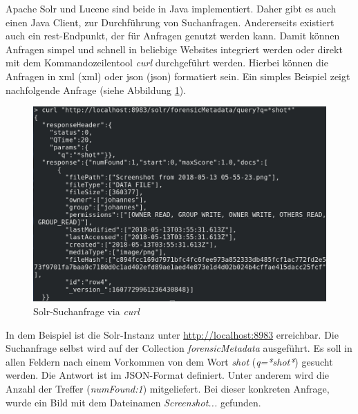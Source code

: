 \noindent
Apache Solr und Lucene sind beide in Java implementiert. Daher gibt es auch einen Java Client, zur Durchführung von Suchanfragen. Andererseits existiert auch ein \gls{rest}-Endpunkt, der für Anfragen genutzt werden kann. Damit können Anfragen simpel und schnell in beliebige Websites integriert werden oder direkt mit dem Kommandozeilentool \textit{curl} durchgeführt werden. Hierbei können die Anfragen in \acrshort{xml} (\acrlong{xml}) oder \acrshort{json} (\acrlong{json}) formatiert sein. Ein simples Beispiel zeigt nachfolgende Anfrage (siehe Abbildung \ref{fig:solr_request}).\\

\begin{figure}[ht]
  \centering
  \includegraphics[width=\textwidth]{./resource/solr_request.png}
  \caption{Solr-Suchanfrage via \textit{curl}}
  \label{fig:solr_request}
\end{figure}

\noindent
In dem Beispiel ist die Solr-Instanz unter \url{http://localhost:8983} erreichbar. Die Suchanfrage selbst wird auf der Collection \textit{forensicMetadata} ausgeführt. Es soll in allen Feldern nach einem Vorkommen von dem Wort \textit{shot} (\textit{q=*shot*}) gesucht werden. Die Antwort ist im JSON-Format definiert. Unter anderem wird die Anzahl der Treffer (\textit{numFound:1}) mitgeliefert. Bei dieser konkreten Anfrage, wurde ein Bild mit dem Dateinamen \textit{Screenshot...} gefunden. 